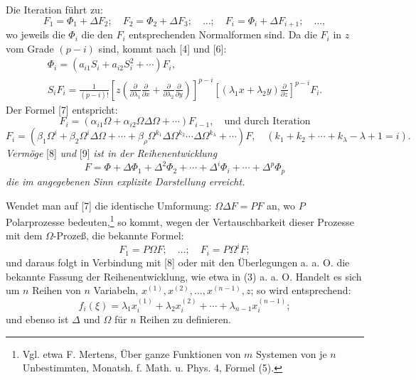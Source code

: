 \documentclass[11pt]{article}
\providecommand{\p}{\partial}
\providecommand{\p}{\partial}
\begin{document}
Die Iteration führt zu:
\[
        F_1=\Phi_1+\Delta F_2;\quad F_2=\Phi_2+\Delta F_3;\quad\ldots;\quad
        F_i=\Phi_i+\Delta F_{i+1};\quad\ldots,
\]
wo jeweils die $\Phi_i$ die den $F_i$ entsprechenden Normalformen sind. Da die $F_i$ in $z$ vom Grade $(p-i)$ sind, kommt nach [4] und [6]:
\begin{equation}
\begin{gathered}
        \Phi_i=(a_{i1}S_i+a_{i2}S_i^2+\cdots)F_i,\\
        S_iF_i=\frac1{(p-i)!}
        \left[z\left(\frac{\p}{\p\lambda_1}\frac{\p}{\p x}+
        \frac{\p}{\p\lambda_2}\frac{\p}{\p y}\right)\right]^{p-i}
        \left[(\lambda_1x+\lambda_2y)\frac{\p}{\p z}\right]^{p-i}F_i.
\end{gathered}
\tag{8}
\end{equation}
Der Formel [7] entspricht:
\[
        F_i=(\alpha_{i1}\Omega+\alpha_{i2}\Omega\Delta\Omega+\cdots)F_{i-1},
        \quad\text{und durch Iteration}
\]
\begin{equation}
        F_i=(\beta_1\Omega^i+\beta_2\Omega^i\Delta\Omega+\cdots
        +\beta_\rho\Omega^{k_1}\Delta\Omega^{k_2}\cdots\Delta\Omega^{k_\lambda}+\cdots)F,
        \quad(k_1+k_2+\cdots+k_\lambda-\lambda+1=i).
\tag{9}
\end{equation}
\emph{Vermöge} [8] \emph{und} [9] \emph{ist in der Reihenentwicklung}
\[
        F=\Phi+\Delta\Phi_1+\Delta^2\Phi_2+\cdots+\Delta^i\Phi_i+\cdots+\Delta^p\Phi_p
\]
\emph{die im angegebenen Sinn explizite Darstellung erreicht.}

Wendet man auf [7] die identische Umformung: $\Omega\Delta F=PF$ an, wo $P$ Polarprozesse bedeuten,\footnote{Vgl. etwa F. Mertens, Über ganze Funktionen von $m$ Systemen von je $n$ Unbestimmten, Monatsh. f. Math. u. Phys. 4, Formel (5).} so kommt, wegen der Vertauschbarkeit dieser Prozesse mit dem $\Omega$-Prozeß, die bekannte Formel:
\[
        F_1=P\Omega F;\quad\ldots;\quad F_i=P\Omega^iF;
\]
und daraus folgt in Verbindung mit [8] oder mit den Überlegungen a. a. O. die bekannte Fassung der Reihenentwicklung, wie etwa in (3) a. a. O. Handelt es sich um $n$ Reihen von $n$ Variabeln, $x^{(1)},x^{(2)},\ldots,x^{(n-1)},z$; so wird entsprechend:
\[
        f_i(\xi)=\lambda_1x_i^{(1)}+\lambda_2x_i^{(2)}+\cdots+\lambda_{n-1}x_i^{(n-1)};
\]
und ebenso ist $\Delta$ und $\Omega$ für $n$ Reihen zu definieren.
\end{document}

